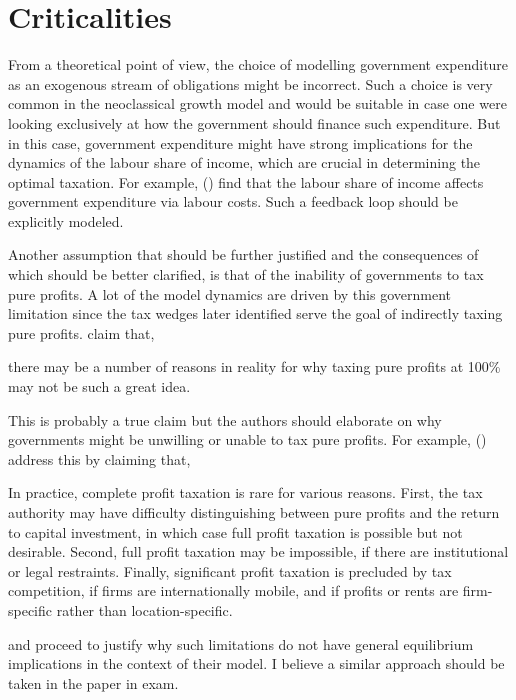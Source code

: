 \documentclass[american]{scrartcl}
\newcommand{\citein}[1]{\citeauthor{#1} (\citeyear{#1})}
\begin{document}
\section{Criticalities}

From a theoretical point of view, the choice of modelling government expenditure as an exogenous stream of obligations might be incorrect. Such a choice is very common in the neoclassical growth model and would be suitable in case one were looking exclusively at how the government should finance such expenditure. But in this case, government expenditure might have strong implications for the dynamics of the labour share of income, which are crucial in determining the optimal taxation. For example, \citein{Facchini2016} find that the labour share of income affects government expenditure via labour costs. Such a feedback loop should be explicitly modeled.

Another assumption that should be further justified and the consequences of which should be better clarified, is that of the inability of governments to tax pure profits. A lot of the model dynamics are driven by this government limitation since the tax wedges later identified serve the goal of indirectly taxing pure profits. \citeauthor{Atesagaoglu2020} claim that,

\begin{displayquote}[p. 12]
    there may be a number of reasons in reality for why taxing pure profits at 100\% may not be such a great idea.
\end{displayquote}

This is probably a true claim but the authors should elaborate on why governments might be unwilling or unable to tax pure profits. For example, \citein{Huizinga1997} address this by claiming that,

\begin{displayquote}[p. 156]
    In practice, complete profit taxation is rare for various reasons. First, the tax authority may have difficulty distinguishing between pure profits and the return to capital investment, in which case full profit taxation is possible but not desirable. Second, full profit taxation may be impossible, if there are institutional or legal restraints. Finally, significant profit taxation is precluded by tax competition, if firms are internationally mobile, and if profits or rents are firm-specific rather than location-specific.
\end{displayquote}

and proceed to justify why such limitations do not have general equilibrium implications in the context of their model. I believe a similar approach should be taken in the paper in exam.
\end{document}
